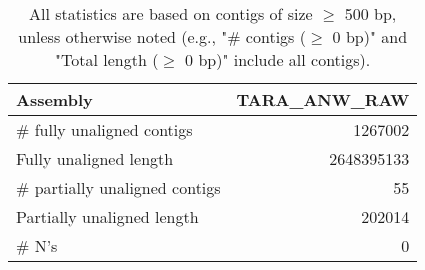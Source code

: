\documentclass[12pt,a4paper]{article}
\begin{document}
\begin{table}[ht]
\begin{center}
\caption{All statistics are based on contigs of size $\geq$ 500 bp, unless otherwise noted (e.g., "\# contigs ($\geq$ 0 bp)" and "Total length ($\geq$ 0 bp)" include all contigs).}
\begin{tabular}{|l*{1}{|r}|}
\hline
Assembly & TARA\_ANW\_RAW \\ \hline
\# fully unaligned contigs & 1267002 \\ \hline
Fully unaligned length & 2648395133 \\ \hline
\# partially unaligned contigs & 55 \\ \hline
Partially unaligned length & 202014 \\ \hline
\# N's & 0 \\ \hline
\end{tabular}
\end{center}
\end{table}
\end{document}
